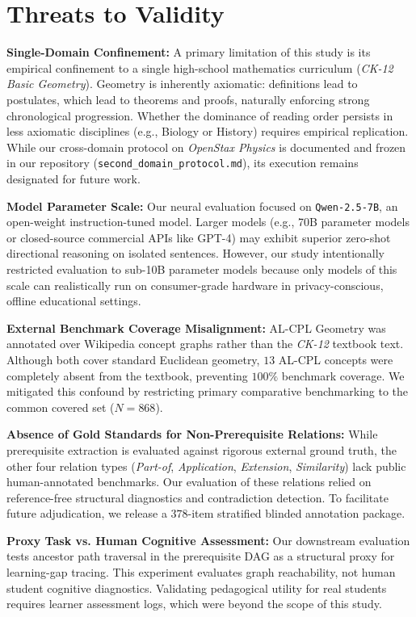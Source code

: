 \section{Threats to Validity}
\label{sec:threats_to_validity}

\textbf{Single-Domain Confinement:} A primary limitation of this study is its empirical confinement to a single high-school mathematics curriculum (\textit{CK-12 Basic Geometry}). Geometry is inherently axiomatic: definitions lead to postulates, which lead to theorems and proofs, naturally enforcing strong chronological progression. Whether the dominance of reading order persists in less axiomatic disciplines (e.g., Biology or History) requires empirical replication. While our cross-domain protocol on \textit{OpenStax Physics} is documented and frozen in our repository (\texttt{second\_domain\_protocol.md}), its execution remains designated for future work.

\textbf{Model Parameter Scale:} Our neural evaluation focused on \texttt{Qwen-2.5-7B}, an open-weight instruction-tuned model. Larger models (e.g., 70B parameter models or closed-source commercial APIs like GPT-4) may exhibit superior zero-shot directional reasoning on isolated sentences. However, our study intentionally restricted evaluation to sub-10B parameter models because only models of this scale can realistically run on consumer-grade hardware in privacy-conscious, offline educational settings.

\textbf{External Benchmark Coverage Misalignment:} AL-CPL Geometry was annotated over Wikipedia concept graphs rather than the \textit{CK-12} textbook text. Although both cover standard Euclidean geometry, $13$ AL-CPL concepts were completely absent from the textbook, preventing $100\%$ benchmark coverage. We mitigated this confound by restricting primary comparative benchmarking to the common covered set ($N=868$).

\textbf{Absence of Gold Standards for Non-Prerequisite Relations:} While prerequisite extraction is evaluated against rigorous external ground truth, the other four relation types (\textit{Part-of}, \textit{Application}, \textit{Extension}, \textit{Similarity}) lack public human-annotated benchmarks. Our evaluation of these relations relied on reference-free structural diagnostics and contradiction detection. To facilitate future adjudication, we release a $378$-item stratified blinded annotation package.

\textbf{Proxy Task vs. Human Cognitive Assessment:} Our downstream evaluation tests ancestor path traversal in the prerequisite DAG as a structural proxy for learning-gap tracing. This experiment evaluates graph reachability, not human student cognitive diagnostics. Validating pedagogical utility for real students requires learner assessment logs, which were beyond the scope of this study.
